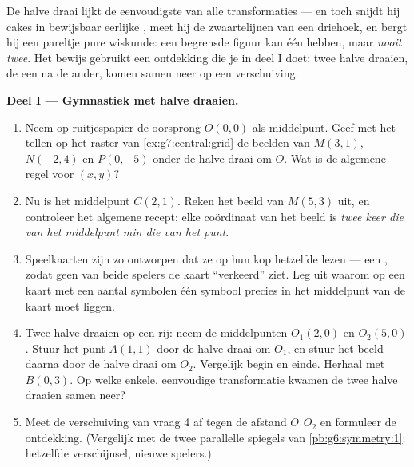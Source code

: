 \begin{problem}
\label{pb:g7:central:1}
De halve draai lijkt de eenvoudigste van alle transformaties --- en toch snijdt hij
cakes in bewijsbaar eerlijke , meet hij de zwaartelijnen van een driehoek, en
bergt hij een pareltje pure wiskunde: een begrensde figuur kan één
 hebben, maar \emph{nooit twee}. Het bewijs gebruikt een
ontdekking die je in deel I doet: twee halve draaien, de een na de ander, komen samen
neer op een verschuiving.

\medskip
\noindent\textbf{Deel I --- Gymnastiek met halve draaien.}
\begin{enumerate}
  \item Neem op ruitjespapier de oorsprong $O(0, 0)$ als middelpunt. Geef met het
        tellen op het raster van \cref{ex:g7:central:grid} de beelden van
        $M(3, 1)$, $N(-2, 4)$ en $P(0, -5)$ onder de halve draai om $O$. Wat is de
        algemene regel voor $(x, y)$?
  \item Nu is het middelpunt $C(2, 1)$. Reken het beeld van $M(5, 3)$ uit, en
        controleer het algemene recept: elke coördinaat van het beeld is
        \emph{twee keer die van het middelpunt min die van het punt}.
  \item Speelkaarten zijn zo ontworpen dat ze op hun kop hetzelfde lezen --- een
        , zodat geen van beide spelers de kaart ``verkeerd'' ziet. Leg
        uit waarom op een kaart met een \emph{} aantal symbolen één symbool
        precies in het middelpunt van de kaart moet liggen.
  \item Twee halve draaien op een rij: neem de middelpunten $O_1(2, 0)$ en
        $O_2(5, 0)$. Stuur het punt $A(1, 1)$ door de halve draai om $O_1$, en stuur
        het beeld daarna door de halve draai om $O_2$. Vergelijk begin en einde.
        Herhaal met $B(0, 3)$. Op welke enkele, eenvoudige transformatie kwamen de
        twee halve draaien samen neer?
  \item Meet de verschuiving van vraag 4 af tegen de afstand $O_1 O_2$ en formuleer
        de ontdekking. (Vergelijk met de twee parallelle spiegels van
        \cref{pb:g6:symmetry:1}: hetzelfde verschijnsel, nieuwe spelers.)
\end{enumerate}


\end{problem}
